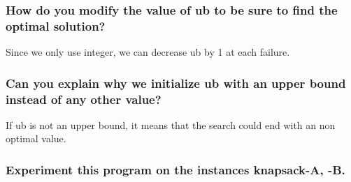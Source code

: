 \documentclass[a4paper ,12pt,french]{article}
\begin{document}
\subsubsection{How do you modify the value of ub to be sure to find the optimal solution?}

Since we only use integer, we can decrease ub by 1 at each failure.

\subsubsection{Can you explain why we initialize ub with an upper bound instead of any other value?}

If ub is not an upper bound, it means that the search could end with an non optimal value.

\subsubsection{Experiment this program on the instances knapsack-A, -B. }
\end{document}
